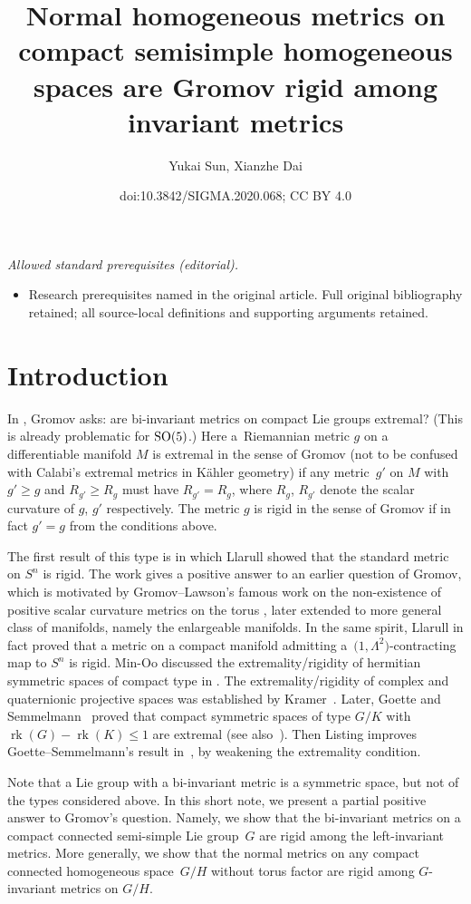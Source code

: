 \documentclass[10pt,a4paper]{amsart}
\title{Normal homogeneous metrics on compact semisimple homogeneous spaces are Gromov rigid among invariant metrics}
\author{Yukai Sun, Xianzhe Dai}
\date{doi:10.3842/SIGMA.2020.068; CC BY 4.0}
\begin{document}
\maketitle
\noindent\textit{Allowed standard prerequisites (editorial).}\begin{itemize}
\item Research prerequisites named in the original article. Full original bibliography retained; all source-local definitions and supporting arguments retained.
\end{itemize}\medskip
\section{Introduction}

In \cite{2}, Gromov asks: are bi-invariant metrics on compact Lie groups extremal? (This is already problematic for ${\rm SO}(5)$.) Here a~Riemannian metric $g$ on a differentiable manifold $M$ is extremal in the sense of Gromov (not to be confused with Calabi's extremal metrics in K\"ahler geometry) if any metric~$g'$ on $M$ with $g' \geq g$ and $R_{g'} \geq R_{g}$ must have $R_{g'}= R_{g}$, where $R_g$, $R_{g'}$ denote the scalar curvature of $g$, $g'$ respectively. The metric $g$ is rigid in the sense of Gromov if in fact $g'=g$ from the conditions above.

The first result of this type is \cite{3} in which Llarull showed that the standard metric on $S^n$ is rigid. The work gives a positive answer to an earlier question of Gromov, which is motivated by Gromov--Lawson's famous work on the non-existence of positive scalar curvature metrics on the torus \cite{9}, later extended to more general class of manifolds, namely the enlargeable manifolds. In the same spirit, Llarull in fact proved that a metric on a compact manifold admitting a~$\big(1,\Lambda^2\big)$-contracting map to $S^{n}$ is rigid. Min-Oo discussed the extremality/rigidity of hermitian symmetric spaces of compact type in \cite{7}. The extremality/rigidity of complex and quaternionic projective spaces was established by Kramer~\cite{8}. Later, Goette and Semmel\-mann~\cite{6} proved that compact symmetric spaces of type $G/K$ with $\operatorname{rk}(G)-\operatorname{rk}(K)\leq 1$ are extremal (see also~\cite{16}). Then Listing improves Goette--Semmelmann's result in~\cite{4}, by weakening the extremality condition.

Note that a Lie group with a bi-invariant metric is a symmetric space, but not of the types considered above. In this short note, we present a partial positive answer to Gromov's question. Namely, we show that the bi-invariant metrics on a compact connected semi-simple Lie group~$G$ are rigid among the left-invariant metrics. More generally, we show that the normal metrics on any compact connected homogeneous space~$G/H$ without torus factor are rigid among $G$-invariant metrics on $G/H$.
\end{document}

